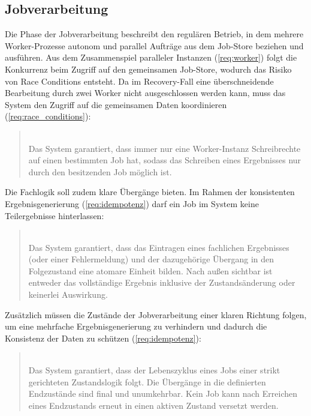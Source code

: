 \subsection{Jobverarbeitung}
\label{subsec:anforderungen_jobverarbeitung}
Die Phase der Jobverarbeitung beschreibt den regulären Betrieb, in dem mehrere Worker-Prozesse autonom und parallel Aufträge aus
dem Job-Store beziehen und ausführen.
Aus dem Zusammenspiel paralleler Instanzen (\ref{req:worker}) folgt die Konkurrenz beim Zugriff auf den gemeinsamen Job-Store, wodurch
das Risiko von Race Conditions entsteht.
Da im Recovery-Fall eine überschneidende Bearbeitung durch zwei Worker nicht ausgeschlossen werden kann,
muss das System den Zugriff auf die gemeinsamen Daten koordinieren (\ref{req:race_conditions}):
\begin{quote}
     \\
    Das System garantiert, dass immer nur eine Worker-Instanz Schreibrechte auf einen bestimmten Job hat, sodass das Schreiben
    eines Ergebnisses nur durch den besitzenden Job möglich ist.
\end{quote}
Die Fachlogik soll zudem klare Übergänge bieten.
Im Rahmen der konsistenten Ergebnisgenerierung (\ref{req:idempotenz}) darf ein Job im System keine Teilergebnisse hinterlassen:
\begin{quote}
     \\
    Das System garantiert, dass das Eintragen eines fachlichen Ergebnisses (oder einer Fehlermeldung) und der dazugehörige Übergang
    in den Folgezustand eine atomare Einheit bilden.
    Nach außen sichtbar ist entweder das vollständige Ergebnis inklusive der Zustandsänderung oder keinerlei Auswirkung.
\end{quote}
Zusätzlich müssen die Zustände der Jobverarbeitung einer klaren Richtung folgen, um eine mehrfache Ergebnisgenerierung zu verhindern
und dadurch die Konsistenz der Daten zu schützen (\ref{req:idempotenz}):
\begin{quote}
     \\
    Das System garantiert, dass der Lebenszyklus eines Jobs einer strikt gerichteten Zustandslogik folgt.
    Die Übergänge in die definierten Endzustände sind final und unumkehrbar.
    Kein Job kann nach Erreichen eines Endzustands erneut in einen aktiven Zustand versetzt werden.
\end{quote}

